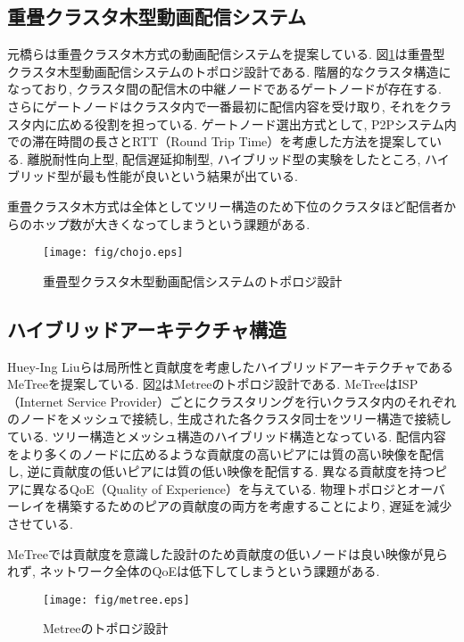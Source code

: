 \subsection{重畳クラスタ木型動画配信システム}
元橋らは重畳クラスタ木方式の動画配信システムを提案している\cite{chojo}. 図\ref{fig:chojo}は重畳型クラスタ木型動画配信システムのトポロジ設計である. 階層的なクラスタ構造になっており, クラスタ間の配信木の中継ノードであるゲートノードが存在する. さらにゲートノードはクラスタ内で一番最初に配信内容を受け取り, それをクラスタ内に広める役割を担っている. ゲートノード選出方式として, P2Pシステム内での滞在時間の長さとRTT（Round Trip Time）を考慮した方法を提案している. 離脱耐性向上型, 配信遅延抑制型, ハイブリッド型の実験をしたところ, ハイブリッド型が最も性能が良いという結果が出ている.

重畳クラスタ木方式は全体としてツリー構造のため下位のクラスタほど配信者からのホップ数が大きくなってしまうという課題がある.

\begin{figure}
  \centering
  \texttt{[image: fig/chojo.eps]}
  \caption{重畳型クラスタ木型動画配信システムのトポロジ設計}
  \label{fig:chojo}
\end{figure}

\newpage

\subsection{ハイブリッドアーキテクチャ構造}
Huey-Ing Liuらは局所性と貢献度を考慮したハイブリッドアーキテクチャであるMeTreeを提案している\cite{metree}. 図\ref{fig:metree}はMetreeのトポロジ設計である. MeTreeはISP（Internet Service Provider）ごとにクラスタリングを行いクラスタ内のそれぞれのノードをメッシュで接続し, 生成された各クラスタ同士をツリー構造で接続している. ツリー構造とメッシュ構造のハイブリッド構造となっている. 配信内容をより多くのノードに広めるような貢献度の高いピアには質の高い映像を配信し, 逆に貢献度の低いピアには質の低い映像を配信する. 異なる貢献度を持つピアに異なるQoE（Quality of Experience）を与えている. 物理トポロジとオーバーレイを構築するためのピアの貢献度の両方を考慮することにより, 遅延を減少させている.

MeTreeでは貢献度を意識した設計のため貢献度の低いノードは良い映像が見られず, ネットワーク全体のQoEは低下してしまうという課題がある.

\begin{figure}
  \centering
  \texttt{[image: fig/metree.eps]}
  \caption{Metreeのトポロジ設計}
  \label{fig:metree}
\end{figure}
